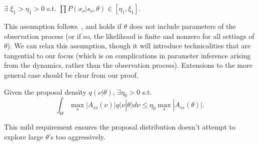 \begin{assumption}
$\exists$ $ \xi_1 > \eta_1 > 0$ s.t. 
$\prod P(x_o | s_o, \theta) \in [\eta_1, \xi_1]$.
  \label{asmp:obs_bnd}
\end{assumption}
\noindent This assumption follows~\cite{miasojedow2017}, and holds if 
$\theta$ does not include parameters of the observation process (or if so,
the likelihood is finite and nonzero for all settings of $\theta$). We can relax this assumption,
though it will introduce technicalities that are tangential to our focus
(which is on complications in parameter inference arising from the 
dynamics, rather than the observation process). Extensions to the more 
general case should be clear from our proof.

\begin{assumption}
Given the proposal density $q(\nu | \theta)$, $\exists \eta_0 > 0$ s.t. $$ \int_\Theta \max_s|A_{ss}(\nu)| q(\nu | \theta)d\nu \leq \eta_0 \max_s|A_{ss}(\theta)|.$$
\end{assumption}
\noindent This mild requirement ensures the proposal distribution doesn't attempt
to explore large $\theta$'s too aggressively.


